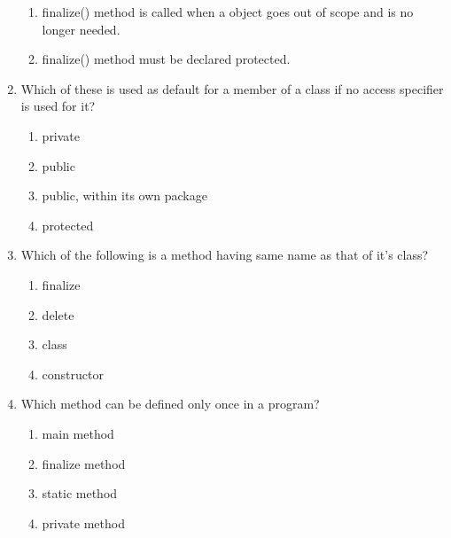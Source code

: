 \documentclass[11pt,a4paper]{article}
\begin{document}
\begin{enumerate}
\begin{enumerate}
        \item finalize() method is called when a object goes out of scope and is no longer needed.
        \item finalize() method must be declared protected.
    \end{enumerate}
\item Which of these is used as default for a member of a class if no access specifier is used for it?
    \begin{enumerate}
        \item private
        \item public
        \item public, within its own package
        \item protected
    \end{enumerate}
\item Which of the following is a method having same name as that of it’s class?
    \begin{enumerate}
        \item finalize
        \item delete
        \item class
        \item constructor
    \end{enumerate}

\item Which method can be defined only once in a program?
    \begin{enumerate}
        \item main method
        \item finalize method
        \item static method
        \item private method
    \end{enumerate}

    \end{enumerate}
\end{document}
